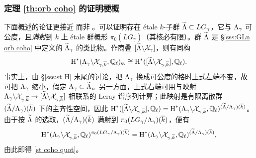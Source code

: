 \subsubsection{定理 \ref{th:orb coho} 的证明梗概}\label{sss:pf SO} 下面概述的论证更接近 \cite{GKM} 而非 \cite{NgoFL}。可以证明存在 étale $k$-子群 $\wt\L\subset LG_{\gamma}$，它与 $\L_{\gamma}$ 可公度，且{\em 满射}到 $k$ 上 étale 群概形 $\pi_{0}(LG_{\gamma})$（其核必有限）。群 $\wt\L$ 是 \S\ref{sss:GLn orb coho} 中定义的 $\wt\L_{\gamma}$ 的类比物。作商叠 $[\wt\L\bs \sX_{\gamma}]$，则有同构
\begin{equation}\label{st coho quot}
\cohog{*}{\L_{\gamma}\bs\sX_{\gamma,\kbar},\Ql}_{\st}\cong \cohog{*}{[\wt\L\bs\sX_{\gamma,\kbar}],\Ql}.
\end{equation}
事实上，由 \S\ref{sss:st H} 末尾的讨论，把 $\L_{\gamma}$ 换成可公度的格时上式左端不变，故可把 $\L_{\gamma}$ 缩小，假定 $\L_{\gamma}\subset \wt\L$。另一方面，上式右端可用与映射 $\L_{\gamma}\bs\sX_{\gamma,\kbar}\to[\wt\L\bs\sX_{\gamma,\kbar}]$ 相联系的 Leray 谱序列计算；此映射是有限离散群 $(\wt\L/\L_{\gamma})(\kbar)$ 下的主齐性空间，因此 $\cohog{*}{[\wt\L\bs\sX_{\gamma,\kbar}],\Ql}=\cohog{*}{\L_{\gamma}\bs\sX_{\gamma,\kbar},\Ql}^{(\wt\L/\L_{\gamma})(\kbar)}$。由于按 $\wt\L$ 的选取，$(\wt\L/\L_{\gamma})(\kbar)$ 满射到 $\pi_{0}(LG_{\gamma}/\L_{\gamma})(\kbar)$，便有
\begin{equation*}
\cohog{*}{\L_{\gamma}\bs\sX_{\gamma,\kbar},\Ql}^{\pi_{0}(LG_{\gamma}/\L_{\gamma})(\kbar)}=\cohog{*}{\L_{\gamma}\bs\sX_{\gamma,\kbar},\Ql}^{(\wt\L/\L_{\gamma})(\kbar)},
\end{equation*}
由此即得 \eqref{st coho quot}。

